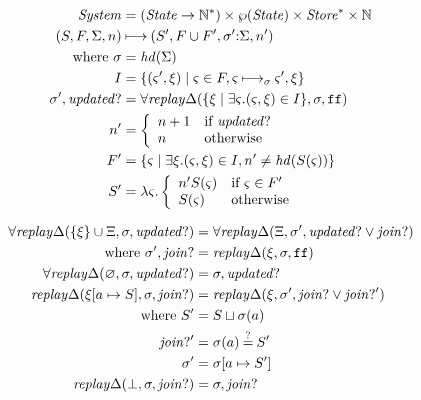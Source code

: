 \documentclass{llncs}
\begin{document}
\begin{align*}
\mathit{System} &= (\mathit{State} \to {\mathbb N}^*) \times \wp(\mathit{State}) \times \mathit{Store}^* \times {\mathbb N} \\
(S,F,\Sigma,n) &\mathbin{\longmapsto} (S', F \cup F', \sigma' {\tt :} \Sigma,n') \\
 \text{ where }
 \sigma &= \mathit{hd}(\Sigma) \\
  I &= \{ (\varsigma', \xi) \mid \varsigma \in F, \varsigma \mathbin{\longmapsto}_\sigma \varsigma', \xi\} \\
  \sigma',\mathit{updated?} &=
     \forall\mathit{replay}\Delta(\{\xi \mid \exists \varsigma. (\varsigma, \xi) \in I\}, \sigma,{\tt ff}) \\
  n' &= \left\{\begin{array}{ll}
                n + 1 & \text{if } \mathit{updated?} \\
                n & \text{otherwise}
               \end{array}\right. \\
  F' &= \{\varsigma \mid \exists \xi. (\varsigma,\xi) \in I,
                n' \neq \mathit{hd}(S(\varsigma))\} \\
  S' &= \lambda \varsigma. \left\{\begin{array}{ll}
                                 n' S(\varsigma) & \text{if } \varsigma \in F' \\
                                 S(\varsigma) & \text{otherwise}
                                \end{array}\right.
\end{align*}

\begin{align*}
  \forall\mathit{replay}\Delta(\{\xi\} \cup \Xi, \sigma, \mathit{updated?}) &=
    \forall\mathit{replay}\Delta(\Xi, \sigma', \mathit{updated?} \vee \mathit{join?}) \\
   \text{ where } \sigma', \mathit{join?} &= \mathit{replay}\Delta(\xi, \sigma, {\tt ff}) \\
  \forall\mathit{replay}\Delta(\varnothing, \sigma, \mathit{updated?}) &= \sigma, \mathit{updated?} \\
  \mathit{replay}\Delta(\xi[a \mapsto S], \sigma, \mathit{join?}) &=
   \mathit{replay}\Delta(\xi, \sigma', \mathit{join?} \vee \mathit{join?}') \\
  \text{ where } S' &= S \sqcup \sigma(a) \\
                 \mathit{join?}' &= \sigma(a) \mathbin{\overset{?}{=}} S' \\
                 \sigma' &= \sigma[a \mapsto S'] \\
  \mathit{replay}\Delta(\bot, \sigma, \mathit{join?}) &= \sigma, \mathit{join?}
\end{align*}
\end{document}
